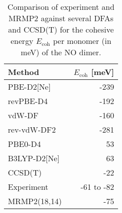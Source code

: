 \begin{table}
\caption{\label{tab:dimer_ecoh}Comparison of experiment and MRMP2 against several DFAs and CCSD(T) for the cohesive energy $E_\textrm{coh}$ per monomer (in meV) of the NO dimer.}
\begin{adjustbox}{center}
\begin{tabular}{lr}
\toprule
Method & $E_\textrm{coh}$ [meV] \\ 
\midrule
PBE-D2[Ne] & -239 \\
revPBE-D4 & -192 \\
vdW-DF & -160 \\
rev-vdW-DF2 & -281 \\
PBE0-D4 & 53 \\
B3LYP-D2[Ne] & 63 \\
CCSD(T)~\cite{tobitaCriticalComparisonSinglereference2003} & -22 \\
Experiment~\cite{ivanicHighlevelTheoreticalStudy2012a} & -61 to -82 \\
MRMP2(18,14)~\cite{ivanicHighlevelTheoreticalStudy2012a} & -75 \\
\bottomrule
\end{tabular}
\end{adjustbox}
\end{table}
